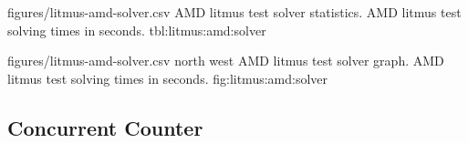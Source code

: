 

\SolverStatsTable
  {figures/litmus-amd-solver.csv}
  {\textnumero}
  {\AMDRowHeader}
  {AMD litmus test solver statistics.}
  {AMD litmus test solving times in seconds.}
  {tbl:litmus:amd:solver}

\SolverStatsGraph
  {figures/litmus-amd-solver.csv}
  {north west}
  {AMD litmus test solver graph.}
  {AMD litmus test solving times in seconds.}
  {fig:litmus:amd:solver}

\newpage

\subsection*{Concurrent Counter}

\newcommand{\tikzmark}[1]{\tikz[overlay,remember picture] \node (#1) {};}
\newcommand*{\AddNote}[3]{%
  \begin{tikzpicture}[overlay, remember picture]
    \draw [decoration={brace,amplitude=0.5em},decorate,thick,red!60!black]
      ($(#1)!([yshift=1.5ex]#1)!($(#1)-(0,1)$)$) --
      ($(#1)!(#2)!($(#1)-(0,1)$)$)
      node [align=center, text width=1.0cm, pos=0.5, anchor=west] {\textsf{#3}};
  \end{tikzpicture}
}%



